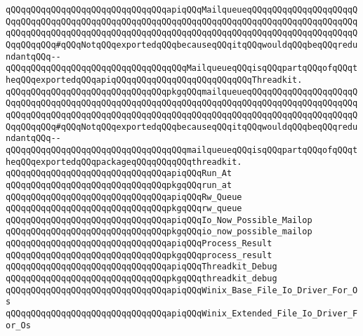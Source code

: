 \newline
\verb|qQQqqQQqqQQqqQQqqQQqqQQqqQQqqQQqapiqQQqMailqueueqQQqqQQqqQQqqQQqqQQqqQQqqQQqqQQqqQQqqQQqqQQqqQQqqQQqqQQqqQQqqQQqqQQqqQQqqQQqqQQqqQQqqQQqqQQqqQQqqQQqqQQqqQQqqQQqqQQqqQQqqQQqqQQqqQQqqQQqqQQqqQQqqQQqqQQqqQQqqQQqqQQqqQQqqQQq#qQQqNotqQQqexportedqQQqbecauseqQQqitqQQqwouldqQQqbeqQQqredundantqQQq--qQQqqQQqqQQqqQQqqQQqqQQqqQQqqQQqqQQqMailqueueqQQqisqQQqpartqQQqofqQQqtheqQQqexportedqQQqapiqQQqqQQqqQQqqQQqqQQqqQQqqQQqThreadkit.|\newline
\verb|qQQqqQQqqQQqqQQqqQQqqQQqqQQqqQQqpkgqQQqmailqueueqQQqqQQqqQQqqQQqqQQqqQQqqQQqqQQqqQQqqQQqqQQqqQQqqQQqqQQqqQQqqQQqqQQqqQQqqQQqqQQqqQQqqQQqqQQqqQQqqQQqqQQqqQQqqQQqqQQqqQQqqQQqqQQqqQQqqQQqqQQqqQQqqQQqqQQqqQQqqQQqqQQqqQQqqQQq#qQQqNotqQQqexportedqQQqbecauseqQQqitqQQqwouldqQQqbeqQQqredundantqQQq--qQQqqQQqqQQqqQQqqQQqqQQqqQQqqQQqqQQqmailqueueqQQqisqQQqpartqQQqofqQQqtheqQQqexportedqQQqpackageqQQqqQQqqQQqthreadkit.|\newline
\newline
\verb|qQQqqQQqqQQqqQQqqQQqqQQqqQQqqQQqapiqQQqRun_At|\newline
\verb|qQQqqQQqqQQqqQQqqQQqqQQqqQQqqQQqpkgqQQqrun_at|\newline
\newline
\verb|qQQqqQQqqQQqqQQqqQQqqQQqqQQqqQQqapiqQQqRw_Queue|\newline
\verb|qQQqqQQqqQQqqQQqqQQqqQQqqQQqqQQqpkgqQQqrw_queue|\newline
\newline
\verb|qQQqqQQqqQQqqQQqqQQqqQQqqQQqqQQqapiqQQqIo_Now_Possible_Mailop|\newline
\verb|qQQqqQQqqQQqqQQqqQQqqQQqqQQqqQQqpkgqQQqio_now_possible_mailop|\newline
\newline
\verb|qQQqqQQqqQQqqQQqqQQqqQQqqQQqqQQqapiqQQqProcess_Result|\newline
\verb|qQQqqQQqqQQqqQQqqQQqqQQqqQQqqQQqpkgqQQqprocess_result|\newline
\newline
\verb|qQQqqQQqqQQqqQQqqQQqqQQqqQQqqQQqapiqQQqThreadkit_Debug|\newline
\verb|qQQqqQQqqQQqqQQqqQQqqQQqqQQqqQQqpkgqQQqthreadkit_debug|\newline
\newline
\verb|qQQqqQQqqQQqqQQqqQQqqQQqqQQqqQQqapiqQQqWinix_Base_File_Io_Driver_For_Os|\newline
\verb|qQQqqQQqqQQqqQQqqQQqqQQqqQQqqQQqapiqQQqWinix_Extended_File_Io_Driver_For_Os|\newline
